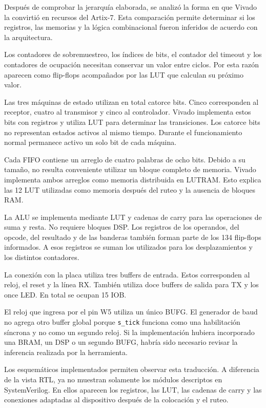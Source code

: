 Después de comprobar la jerarquía elaborada, se analizó la forma en
que Vivado la convirtió en recursos del Artix-7. Esta comparación
permite determinar si los registros, las memorias y la lógica
combinacional fueron inferidos de acuerdo con la arquitectura.

Los contadores de sobremuestreo, los índices de bits, el contador del
timeout y los contadores de ocupación necesitan conservar un valor
entre ciclos. Por esta razón aparecen como flip-flops acompañados por
las LUT que calculan su próximo valor.

Las tres máquinas de estado utilizan en total catorce bits. Cinco
corresponden al receptor, cuatro al transmisor y cinco al
controlador. Vivado implementa estos bits con registros y utiliza LUT
para determinar las transiciones. Los catorce bits no representan
estados activos al mismo tiempo. Durante el funcionamiento normal
permanece activo un solo bit de cada máquina.

Cada FIFO contiene un arreglo de cuatro palabras de ocho bits. Debido
a su tamaño, no resulta conveniente utilizar un bloque completo de
memoria. Vivado implementa ambos arreglos como memoria distribuida en
LUTRAM. Esto explica las 12 LUT utilizadas como memoria después del
ruteo y la ausencia de bloques RAM.

La ALU se implementa mediante LUT y cadenas de carry para las
operaciones de suma y resta. No requiere bloques DSP. Los registros
de los operandos, del opcode, del resultado y de las banderas también
forman parte de los 134 flip-flops informados. A esos registros se
suman los utilizados para los desplazamientos y los distintos contadores.

La conexión con la placa utiliza tres buffers de entrada. Estos
corresponden al reloj, el reset y la línea RX. También utiliza doce
buffers de salida para TX y los once LED. En total se ocupan 15 IOB.

El reloj que ingresa por el pin W5 utiliza un único BUFG. El
generador de baud no agrega otro buffer global porque
\texttt{s\_tick} funciona como una habilitación síncrona y no como un
segundo reloj. Si la implementación hubiera incorporado una BRAM, un
DSP o un segundo BUFG, habría sido necesario revisar la inferencia
realizada por la herramienta.

Los esquemáticos implementados permiten observar esta traducción. A
diferencia de la vista RTL, ya no muestran solamente los módulos
descriptos en SystemVerilog. En ellos aparecen los registros, las
LUT, las cadenas de carry y las conexiones adaptadas al dispositivo
después de la colocación y el ruteo.

